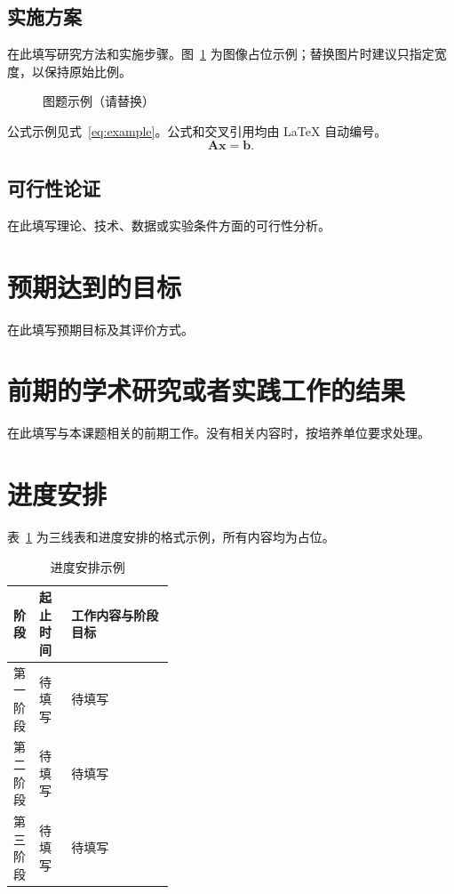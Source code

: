 \documentclass[UTF8,fontset=none,scheme=plain,zihao=-4]{ctexart}
\begin{document}
\subsection{实施方案}
在此填写研究方法和实施步骤。图~\ref{fig:placeholder} 为图像占位示例；替换图片时建议只指定宽度，以保持原始比例。

\begin{figure}[htbp]
  \centering
  \caption{图题示例（请替换）}
  \label{fig:placeholder}
\end{figure}

公式示例见式~\eqref{eq:example}。公式和交叉引用均由 \LaTeX{} 自动编号。
\begin{equation}
  \mathbf{A}\mathbf{x}=\mathbf{b}.
  \label{eq:example}
\end{equation}

\subsection{可行性论证}
在此填写理论、技术、数据或实验条件方面的可行性分析。

\section{预期达到的目标}
在此填写预期目标及其评价方式。

\section{前期的学术研究或者实践工作的结果}
在此填写与本课题相关的前期工作。没有相关内容时，按培养单位要求处理。

\section{进度安排}
表~\ref{tab:schedule} 为三线表和进度安排的格式示例，所有内容均为占位。
\begin{table}[htbp]
  \centering
  \caption{进度安排示例}
  \label{tab:schedule}
  \begin{tabularx}{\linewidth}{@{}p{0.16\linewidth}p{0.20\linewidth}X@{}}
    \toprule
    阶段 & 起止时间 & 工作内容与阶段目标 \\
    \midrule
    第一阶段 & 待填写 & 待填写 \\
    第二阶段 & 待填写 & 待填写 \\
    第三阶段 & 待填写 & 待填写 \\
    \bottomrule
  \end{tabularx}
\end{table}
\end{document}
